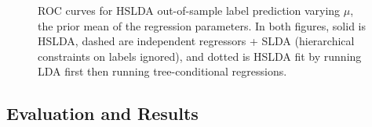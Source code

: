 \begin{figure}[h]
\begin{center}
\caption{ROC curves for HSLDA out-of-sample label prediction varying $\mu$, the prior mean of the regression parameters. 
In both figures, solid is HSLDA, dashed are independent regressors + SLDA (hierarchical 
constraints on labels ignored), and dotted is HSLDA fit by running LDA first then running 
tree-conditional regressions.}
\end{center}
\end{figure}


\subsection{Evaluation and Results}


